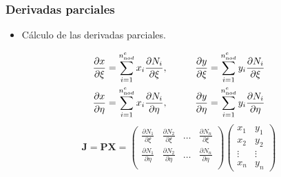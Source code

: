 \documentclass[handout]{beamer}
\begin{document}
\begin{frame}
	\frametitle{Derivadas parciales}
	\begin{itemize}
		\item Cálculo de las derivadas parciales.
	\end{itemize}
	\begin{alignat}{2}
		\frac{\partial x}{\partial \xi}&=\sum_{i=1}^{n^e_{\textrm nod}}
		x_i \frac{\partial N_i}{\partial \xi},\qquad
		&
		\frac{\partial y}{\partial \xi}&=\sum_{i=1}^{n^e_{\textrm nod}}
		y_i \frac{\partial N_i}{\partial \xi} \\
		\frac{\partial x}{\partial \eta}&=\sum_{i=1}^{n^e_{\textrm nod}}
		x_i \frac{\partial N_i}{\partial \eta},\qquad
		&
		\frac{\partial y}{\partial \eta}&=\sum_{i=1}^{n^e_{\textrm nod}}
		y_i \frac{\partial N_i}{\partial \eta}
	\end{alignat}
	\begin{equation}
		\bm{J}=\mathbf{P}\mathbf{X}=
		\left(
		\begin{array}{cccc}
			\frac{\partial N_1}{\partial \xi}&
			\frac{\partial N_2}{\partial \xi}&
			\ldots                           &
			\frac{\partial N_n}{\partial \xi}\\
			\frac{\partial N_1}{\partial \eta}&
			\frac{\partial N_2}{\partial \eta}&
			\ldots                           &
			\frac{\partial N_n}{\partial \eta}\\
		\end{array}
		\right)
		\left(
		\begin{array}{cc}
			x_1    & y_1 \\
			x_2    & y_2 \\
			\vdots & \vdots \\
			x_n    & y_n
		\end{array}
		\right)
	\end{equation}
\end{frame}
\end{document}
